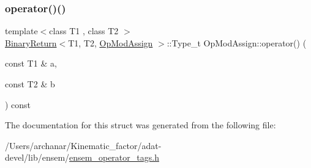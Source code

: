 \subsubsection{\texorpdfstring{operator()()}{operator()()}\hspace{0.1cm}{\footnotesize\ttfamily [3/3]}}
{\footnotesize\ttfamily template$<$class T1 , class T2 $>$ \\
\mbox{\hyperlink{structBinaryReturn}{Binary\+Return}}$<$T1, T2, \mbox{\hyperlink{structOpModAssign}{Op\+Mod\+Assign}} $>$\+::Type\+\_\+t Op\+Mod\+Assign\+::operator() (\begin{DoxyParamCaption}\item[{const T1 \&}]{a,  }\item[{const T2 \&}]{b }\end{DoxyParamCaption}) const\hspace{0.3cm}{\ttfamily [inline]}}



The documentation for this struct was generated from the following file\+:\begin{DoxyCompactItemize}
\item 
/\+Users/archanar/\+Kinematic\+\_\+factor/adat-\/devel/lib/ensem/\mbox{\hyperlink{adat-devel_2lib_2ensem_2ensem__operator__tags_8h}{ensem\+\_\+operator\+\_\+tags.\+h}}\end{DoxyCompactItemize}
